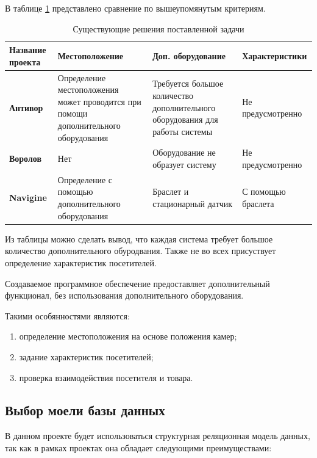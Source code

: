 В таблице \ref{decisions} представлено сравнение по вышеупомянутым критериям.

\begin{table}[ht!]
	\centering
	\caption{Существующие решения поставленной задачи}
	\label{decisions}
	\begin{tabular}{|p{2.6cm}|p{5cm}|p{4cm}|p{4cm}|}
			\hline
			\textbf{Название проекта} & \textbf{Местоположение} & \textbf{Доп. оборудование} & \textbf{Характеристики}\\
			\hline
			\textbf{Антивор \cite{Antivor}} & Определение местоположения может проводится при помощи дополнительного оборудования 
			& Требуется большое количество дополнительного оборудования для работы системы
			 & Не предусмотренно\\
			\hline

			\textbf{Воролов \cite{VOROLOV}} & Нет 
			& Оборудование не образует систему
			 & Не предусмотренно\\
			\hline

			\textbf{Navigine \cite{Navigine}} & Определение с помощью дополнительного оборудования 
			& Браслет и стационарный датчик
			 & С помощью браслета\\
			\hline
	\end{tabular}
\end{table}


Из таблицы можно сделать вывод, что каждая система требует большое количество дополнительного обуродвания.
Также не во всех присуствует определение характеристик посетителей.

Создаваемое программное обеспечение предоставляет дополнительный функционал, без использования дополнительного оборудования.

Такими особянностями являются:

\begin{enumerate}[label=\arabic*.]
	\item определение местоположения на основе положения камер;
	\item задание характеристик посетителей;
	\item проверка взаимодействия посетителя и товара.
\end{enumerate}

\subsection{Выбор моели базы данных}

В данном проекте будет использоваться структурная реляционная модель данных, так как в рамках проектах
она обладает следующими преимуществами:


